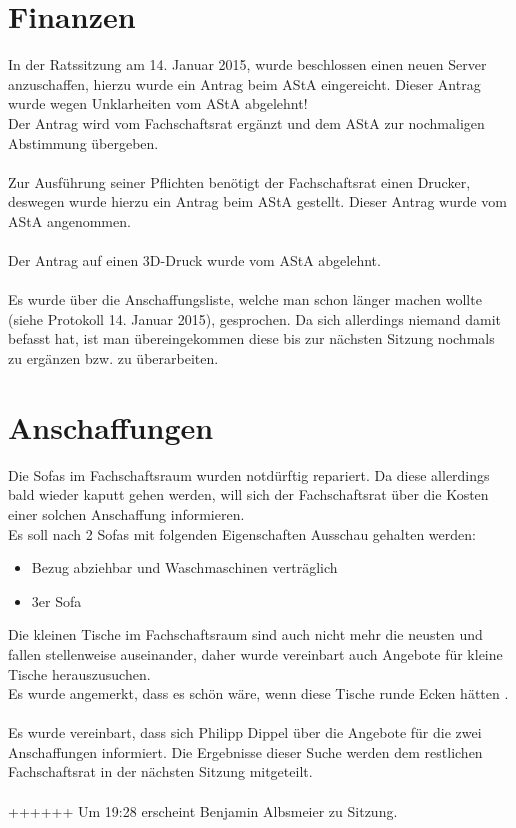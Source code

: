 \documentclass[a4paper, 11pt]{article} %
\newcommand{\abstimmung}[4]{
	\newcounter{summe}
	\setcounter{summe}{#3}
	\addtocounter{summe}{#4}
	\begin{flushleft}
		#1\\
	Es wird über den Antrag abgestimmt.
	\end{flushleft}
	\ifthenelse{\equal{#3}{0}\AND\equal{#4}{0}}{
	\begin{center}
		\textbf{Der Antrag wird einstimmig angenommen.}
	\end{center}
	}{
	\begin{center}
		#2 \ifthenelse{\equal{#2}{1}}{Stimme}{Stimmen} dafür, #3 \ifthenelse{\equal{#3}{1}}{Stimme}{Stimmen} dagegen, #4 \ifthenelse{\equal{#42}{1}}{Enthaltung}{Enthaltungen}\\
		\ifthenelse{#2>\value{summe}}{
		\textbf{Der Antrag ist somit angenommen.}
		}{
		\textbf{Der Antrag ist somit abgelehnt.}
		}
	\end{center}
	}  
}
\begin{document}
\section{Finanzen}
In der Ratssitzung am 14. Januar 2015, wurde beschlossen einen neuen Server anzuschaffen, hierzu wurde ein Antrag beim AStA eingereicht. Dieser Antrag wurde wegen Unklarheiten vom AStA abgelehnt! \\
Der Antrag wird vom Fachschaftsrat ergänzt und dem AStA zur nochmaligen Abstimmung übergeben. \\
\\
Zur Ausführung seiner Pflichten benötigt der Fachschaftsrat einen Drucker, deswegen wurde hierzu ein Antrag beim AStA gestellt. Dieser Antrag wurde vom AStA angenommen. \\
\\
Der Antrag auf einen 3D-Druck wurde vom AStA abgelehnt. \\
\\
Es wurde über die Anschaffungsliste, welche man schon länger machen wollte (siehe Protokoll 14. Januar 2015), gesprochen. Da sich allerdings niemand damit befasst hat, ist man übereingekommen diese bis zur nächsten Sitzung nochmals zu ergänzen bzw. zu überarbeiten. \\
\section{Anschaffungen}

Die Sofas im Fachschaftsraum wurden notdürftig repariert. Da diese allerdings bald wieder kaputt gehen werden, will sich der Fachschaftsrat über die Kosten einer solchen Anschaffung informieren. \\
\newpage
Es soll nach 2 Sofas mit folgenden Eigenschaften Ausschau gehalten werden: 
\begin{itemize}
	\item Bezug abziehbar und Waschmaschinen verträglich
	\item 3er Sofa \\
\end{itemize}
Die kleinen Tische im Fachschaftsraum sind auch nicht mehr die neusten und fallen stellenweise auseinander, daher wurde vereinbart auch Angebote für kleine Tische herauszusuchen. \\
Es wurde angemerkt, dass es schön wäre, wenn diese Tische runde Ecken hätten . \\
\\
Es wurde vereinbart, dass sich Philipp Dippel über die Angebote für die zwei Anschaffungen informiert. Die Ergebnisse dieser Suche werden dem restlichen Fachschaftsrat in der nächsten Sitzung mitgeteilt. \\
\\++++++
Um 19:28 erscheint Benjamin Albsmeier zu Sitzung. \\
\end{document}
